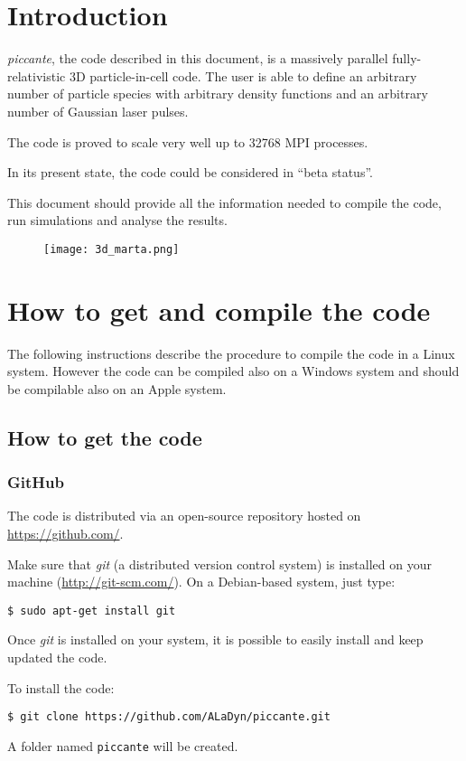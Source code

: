 \documentclass[11pt,a4paper]{report}
\begin{document}
\chapter{Introduction}
\emph{piccante}, the code described in this document, is a massively parallel fully-relativistic 3D particle-in-cell code. The user is able to define an arbitrary number of particle species with arbitrary density functions and an arbitrary number of Gaussian laser pulses.

The code is proved to scale very well up to 32768 MPI processes.

In its present state, the code could be considered in ``beta status''.

This document should provide all the information needed to compile the code, run simulations and analyse the results.
\begin{figure}[h!]
\centering
\texttt{[image: 3d\_marta.png]}
\end{figure}



\chapter{How to get and compile the code}
The following instructions describe the procedure to compile the code in a Linux system. However the code can be compiled also on a Windows system and should be compilable also on an Apple system.
\section{How to get the code} \label{section_getcode}
\subsection{GitHub}  
The code is distributed via an open-source repository hosted on \url{https://github.com/}.

Make sure that \emph{git} (a distributed version control system) is installed on your machine (\url{http://git-scm.com/}).
On a Debian-based system, just type:
\begin{verbatim}
$ sudo apt-get install git
\end{verbatim}
Once \emph{git} is installed on your system, it is possible to easily install and keep updated the code.

To install the code:
\begin{verbatim}
$ git clone https://github.com/ALaDyn/piccante.git
\end{verbatim}
A folder named \verb+piccante+ will be created.
\end{document}
